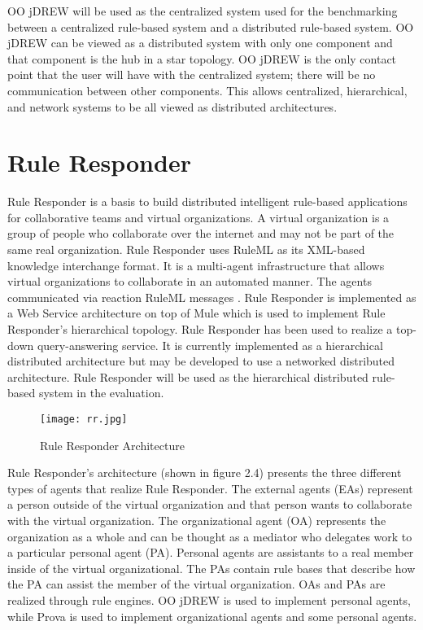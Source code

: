 \documentclass[12pt]{report}
\begin{document}
OO jDREW will be used as the centralized system used for the benchmarking between a centralized rule-based system and a distributed rule-based system.  OO jDREW can be viewed as a distributed system with only one component and that component is the hub in a star topology.  OO jDREW is the only contact point that the user will have with the centralized system; there will be no communication between other components.  This allows centralized, hierarchical, and network systems to be all viewed as distributed architectures.

\section{Rule Responder}	

Rule Responder \cite{RuleResponder,Craig07,PaschkeBoley+2007,PaschkeBoley,CraigBoley08} is a basis to build distributed intelligent rule-based applications for collaborative teams and virtual organizations.  A virtual organization is a group of people who collaborate over the internet and may not be part of the same real organization.  Rule Responder uses RuleML as its XML-based knowledge interchange format.  It is a multi-agent infrastructure that allows virtual organizations to collaborate in an automated manner.  The agents communicated via reaction RuleML messages \cite{ReactionRuleMLOLD}. Rule Responder is implemented as a Web Service architecture on top of Mule which is used to implement Rule Responder's hierarchical topology.  Rule Responder has been used to realize a top-down query-answering service.  It is currently implemented as a hierarchical distributed architecture but may be developed to use a networked distributed architecture.  Rule Responder will be used as the hierarchical distributed rule-based system in the evaluation.

\begin{figure}
\centering
\texttt{[image: rr.jpg]}
\caption{Rule Responder Architecture}\label{fig:4}
\end{figure}

Rule Responder's architecture (shown in figure 2.4) presents the three different types of agents that realize Rule Responder.  The external agents (EAs) represent a person outside of the virtual organization and that person wants to collaborate with the virtual organization.  The organizational agent (OA) represents the organization as a whole and can be thought as a mediator who delegates work to a particular personal agent (PA).  Personal agents are assistants to a real member inside of the virtual organizational.  The PAs contain rule bases that describe how the PA can assist the member of the virtual organization.
OAs and PAs are realized through rule engines.  OO jDREW \cite{OOjDREW} is used to implement personal agents, while Prova \cite{PROVA} is used to implement organizational agents and some personal agents.
\end{document}
